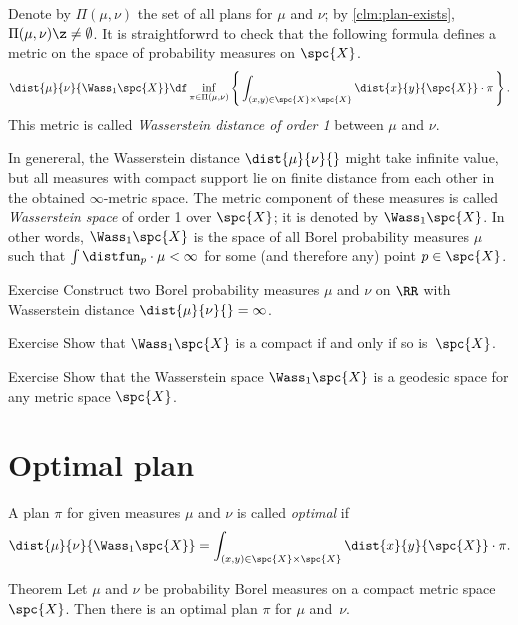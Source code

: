 Denote by $\Pi(\mu,\nu)$ the set of all plans for $\mu$ and $\nu$;
by \ref{clm:plan-exists}, $\Pi(\mu,\nu)\z\ne\emptyset$.
It is straightforwrd to check that the following formula defines a metric on the space of probability measures on $\spc{X}$.
\[\dist{\mu}{\nu}{\Wass_1\spc{X}}
\df
\inf_{\pi\in\Pi(\mu,\nu)}
\left\{\,\int_{(x,y)\in\spc{X}\times\spc{X}}\dist{x}{y}{\spc{X}}\cdot\pi\,\right\}.\]
This metric is called \emph{Wasserstein distance of order 1} between $\mu$ and $\nu$.

In genereral, the Wasserstein distance $\dist{\mu}{\nu}{}$ might take infinite value, but all measures with compact support lie on finite distance from each other in the obtained $\infty$-metric space.
The metric component of these measures is called \emph{Wasserstein space} of order 1 over $\spc{X}$; 
it is denoted by $\Wass_1\spc{X}$.
In other words, $\Wass_1\spc{X}$ is the space of all Borel probability measures $\mu$ such that 
$\int\distfun_p\cdot\mu<\infty$ for some (and therefore any) point $p\in \spc{X}$.

\begin{thm}{Exercise}\label{ex:wasserstein-infty}
Construct two Borel probability measures $\mu$ and $\nu$ on $\RR$ with Wasserstein distance $\dist{\mu}{\nu}{}=\infty$.
\end{thm}


\begin{thm}{Exercise}\label{ex:wasserstein-compact}
Show that $\Wass_1\spc{X}$ is a compact if and only if so is~$\spc{X}$.
\end{thm}

\begin{thm}{Exercise}\label{ex:wasserstein-length}
Show that the Wasserstein space $\Wass_1\spc{X}$ is a geodesic space for any metric space $\spc{X}$.
\end{thm}

\section{Optimal plan}

A plan $\pi$ for given measures $\mu$ and $\nu$ is called \emph{optimal} if 
\[\dist{\mu}{\nu}{\Wass_1\spc{X}}
=\int_{(x,y)\in\spc{X}\times\spc{X}}\dist{x}{y}{\spc{X}}\cdot\pi.\]

\begin{thm}{Theorem} %
Let $\mu$ and $\nu$ be probability Borel measures on a compact metric space $\spc{X}$.
Then there is an optimal plan $\pi$ for $\mu$ and~$\nu$.
\end{thm}

